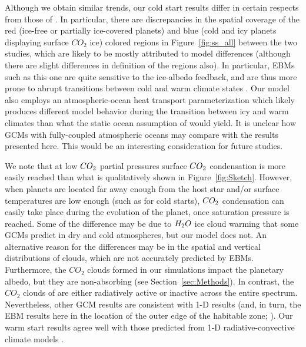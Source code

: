 \documentclass[fleqn,usenatbib]{mnras}
\begin{document}
Although we obtain similar trends, our cold start results differ in certain respects from those of \citet{Turbet2017}. In particular, there are discrepancies in the spatial coverage of the red (ice-free or partially ice-covered planets) and blue (cold and icy planets displaying surface $CO_{\mathrm{2}}$ ice) colored regions in Figure~\ref{fig:ss_all} between the two studies, which are likely to be mostly attributed to model differences (although there are slight differences in definition of the regions also). In particular, EBMs such as this one are quite sensitive to the ice-albedo feedback, and are thus more prone to abrupt transitions between cold and warm climate states \citep{RamirezLevi2018}. Our model also employs an atmospheric-ocean heat transport parameterization which likely produces different model behavior during the transition between icy and warm climates than what the static ocean assumption of \citet{Turbet2017} would yield. It is unclear how GCMs with fully-coupled atmospheric oceans may compare with the results presented here. This would be an interesting consideration for future studies. 

We note that at low $CO_{\rm 2}$ partial pressures surface $CO_{\rm 2}$ condensation is more easily reached than what is qualitatively shown in Figure~\ref{fig:Sketch}. However, when planets are located far away enough from the host star and/or surface temperatures are low enough (such as for cold starts), $CO_{\rm 2}$ condensation can easily take place during the evolution of the planet, once saturation pressure is reached. Some of the difference may be due to $H_{\rm 2}O$ ice cloud warming that some GCMs predict in dry and cold atmospheres, but our model does not. An alternative reason for the differences may be in the spatial and vertical distributions of clouds, which are not accurately predicted by EBMs. Furthermore, the $CO_{\mathrm{2}}$ clouds formed in our simulations impact the planetary albedo, but they are non-absorbing (see Section~\ref{sec:Methods}). In contrast, the $CO_{\mathrm{2}}$ clouds of \citet{Turbet2017} are either radiatively active or inactive across the entire spectrum. Nevertheless, other GCM results are consistent with 1-D results (and, in turn, the EBM results here in the location of the outer edge of the habitable zone; \citet{wolf2018erratum}).
Our warm start results agree well with those predicted from 1-D radiative-convective climate models \citep{kasting1993, KumarKopparapu2013, Ramirez2018}.
\end{document}
